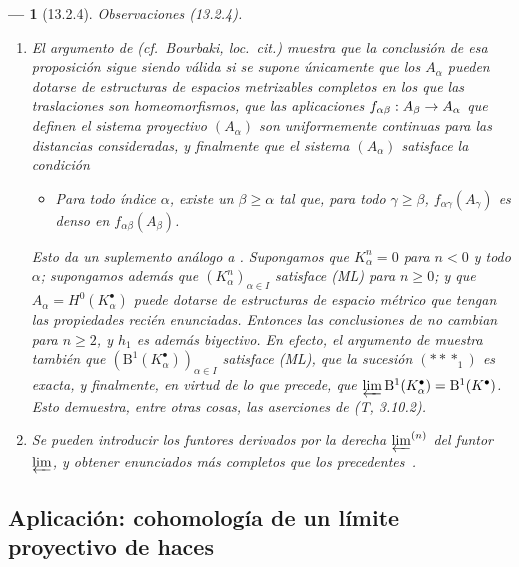 \documentclass[10pt,oneside,openany]{book}
\theoremstyle{egaenv}\newtheorem*{env}{---}
\theoremstyle{egastatement}
\theoremstyle{egadescription}
\renewcommand{\geq}{\geqslant}
\renewcommand{\to}{\mathchoice{\longrightarrow}{\rightarrow}{\rightarrow}{\rightarrow}}
\begin{document}
\begin{env}[13.2.4]
\label{0.13.2.4}
\label{0.13.2.4-fr}
\emph{Observaciones} (13.2.4).
\begin{enumerate}
  \item[{\rm(i)}]
  El argumento de 
  (cf.\ Bourbaki, \emph{loc.\ cit.}) muestra que la conclusión de
  esa proposición sigue siendo válida si se supone únicamente que los
  $A_\alpha$ pueden dotarse de estructuras de espacios metrizables completos
  en los que las traslaciones son homeomorfismos, que las aplicaciones
  $f_{\alpha\beta}:A_\beta\to A_\alpha$ que definen el sistema proyectivo $(A_\alpha)$ son \emph{uniformemente continuas} para las distancias consideradas, y finalmente que el sistema $(A_\alpha)$ satisface la condición
  \begin{itemize}
    \item[(ML$'$)]
    \emph{Para todo índice $\alpha$, existe un $\beta\geq\alpha$ tal
    que, para todo $\gamma\geq\beta$,
    $f_{\alpha\gamma}(A_\gamma)$ es denso en
    $f_{\alpha\beta}(A_\beta)$.}
  \end{itemize}

  Esto da un suplemento análogo a .
  Supongamos que $K_\alpha^n=0$ para $n<0$ y todo $\alpha$; supongamos además que $(K_\alpha^n)_{\alpha\in I}$ satisface (ML) para
  $n\geq0$; y que
  $A_\alpha=H^0(K_\alpha^\bullet)$ puede dotarse de
  estructuras de espacio métrico que tengan las propiedades recién enunciadas.
  Entonces las conclusiones de  no cambian para
  $n\geq2$, y $h_1$ es además \emph{biyectivo}.
  En efecto, el argumento de  muestra también que
  $(\mathrm B^1(K_\alpha^\bullet))_{\alpha\in I}$
  satisface (ML), que la sucesión $(***_1)$ es exacta, y finalmente, en virtud de lo que precede, que $\varprojlim\mathrm B^1(K_\alpha^\bullet)=\mathrm B^1(K^\bullet)$.
  Esto demuestra, entre otras cosas, las aserciones de (T, 3.10.2).

  \item[{\rm(ii)}]
  Se pueden introducir los funtores derivados por la derecha
  $\varprojlim^{(n)}$ del funtor $\varprojlim$, y obtener enunciados más
  completos que los precedentes~\cite{III-28}.
\end{enumerate}
\end{env}

\subsection{Aplicación: cohomología de un límite proyectivo de haces}
\label{subsection:0.13.3}
\label{subsection:0.13.3-fr}
\end{document}
